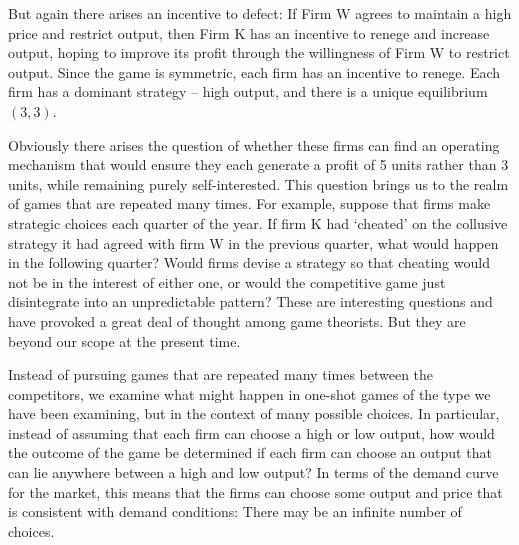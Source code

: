 But again there arises an incentive to defect: If Firm W agrees to maintain
a high price and restrict output, then Firm K has an incentive to renege and
increase output, hoping to improve its profit through the willingness of
Firm W to restrict output. Since the game is symmetric, each firm has an
incentive to renege. Each firm has a dominant strategy -- high output, and
there is a unique equilibrium $(3,3)$.

Obviously there arises the question of whether these firms can find an
operating mechanism that would ensure they each generate a profit of 5 units
rather than 3 units, while remaining purely self-interested. This question
brings us to the realm of games that are repeated many times. For example,
suppose that firms make strategic choices each quarter of the year. If firm
K had `cheated' on the collusive strategy it had agreed with firm W in the
previous quarter, what would happen in the following quarter? Would firms
devise a strategy so that cheating would not be in the interest of either
one, or would the competitive game just disintegrate into an unpredictable
pattern? These are interesting questions and have provoked a great deal of
thought among game theorists. But they are beyond our scope at the present
time. 

Instead of pursuing games that are repeated many times between the
competitors, we examine what might happen in one-shot games of the type we
have been examining, but in the context of many possible choices. In
particular, instead of assuming that each firm can choose a high or low
output, how would the outcome of the game be determined if each firm can
choose an output that can lie anywhere between a high and low output? In
terms of the demand curve for the market, this means that the firms can
choose some output and price that is consistent with demand conditions:
There may be an infinite number of choices.